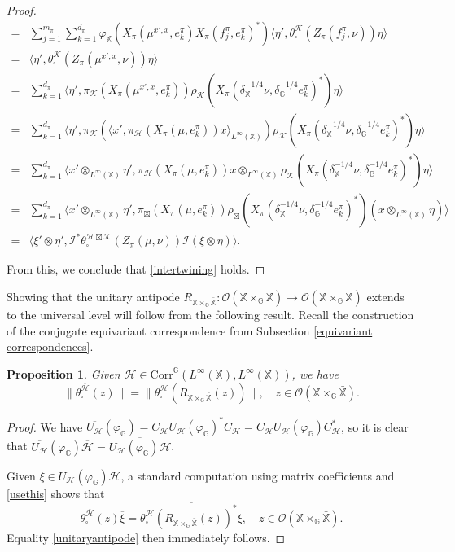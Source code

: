 \documentclass[reqno]{amsart}
\numberwithin{equation}{section}
\newtheorem{Prop}[Theorem]{Proposition}
\newcommand\XGX{\X\times_\G \bar{\X}}
\newcommand{\mcH}{\mathcal{H}}
\newcommand{\mcK}{\mathcal{K}}
\newcommand{\mcO}{\mathcal{O}}
\newcommand{\G}{\mathbb{G}}
\newcommand{\X}{\mathbb{X}}
\newcommand{\Corr}{\mathrm{Corr}}
\begin{document}
\begin{proof}
\begin{align*}
    = &\sum_{j=1}^{m_\pi}\sum_{k=1}^{d_\pi}\varphi_\X(X_\pi(\mu^{x',x}, e_k^\pi)X_\pi(f_j^\pi, e_k^\pi)^*)\langle \eta', \theta_\square^\mcK(Z_\pi(f_j^\pi, \nu))\eta\rangle\\
    = & \langle \eta', \theta_\square^\mcK(Z_\pi(\mu^{x',x}, \nu))\eta\rangle\\
    = & \sum_{k=1}^{d_\pi} \langle \eta', \pi_\mcK(X_\pi(\mu^{x',x}, e_k^\pi))\rho_\mcK(X_\pi(\delta_\X^{-1/4}\nu, \delta_\G^{-1/4}e_k^\pi)^*)\eta\rangle\\
    = & \sum_{k=1}^{d_\pi}\langle \eta', \pi_\mcK(\langle x', \pi_\mcH(X_\pi(\mu, e_k^\pi))x\rangle_{L^\infty(\X)})\rho_\mcK(X_\pi(\delta_\X^{-1/4}\nu, \delta_\G^{-1/4}e_k^\pi)^*)\eta\rangle\\
    =& \sum_{k=1}^{d_\pi} \langle x'\otimes_{L^\infty(\X)} \eta', \pi_\mcH(X_\pi(\mu, e_k^\pi))x\otimes_{L^\infty(\X)} \rho_\mcK(X_\pi(\delta_\X^{-1/4}\nu, \delta_\G^{-1/4}e_k^\pi)^*)\eta\rangle\\
    =&\sum_{k=1}^{d_\pi} \langle x'\otimes_{L^\infty(\X)} \eta', \pi_\boxtimes(X_\pi(\mu, e_k^\pi))\rho_\boxtimes(X_\pi(\delta_\X^{-1/4}\nu, \delta_\G^{-1/4}e_k^\pi)^*)(x\otimes_{L^\infty(\X)} \eta)\rangle\\
    =& \langle \xi'\otimes \eta', \mathcal{I}^*\theta_\square^{\mcH\boxtimes \mcK}(Z_\pi(\mu, \nu)) \mathcal{I}(\xi \otimes \eta)\rangle.
\end{align*}

From this, we conclude that \eqref{intertwining} holds.
 \end{proof}

Showing that the unitary antipode $R_{\XGX}: \mcO(\XGX)\to \mcO(\XGX)$ extends to the universal level will follow from the following result. Recall the construction of the conjugate equivariant correspondence from Subsection \ref{equivariant correspondences}.

\begin{Prop} Given $\mcH \in \Corr^\G(L^\infty(\X), L^\infty(\X))$, we have
\begin{equation}\label{unitaryantipode}
    \|\theta_\square^{\overline{\mcH}}(z)\| = \|\theta_\square^\mcH(R_{\XGX}(z))\|, \quad z\in \mcO(\XGX).
\end{equation}
\end{Prop}
\begin{proof} We have $\overline{U_\mcH}(\varphi_\G)= C_\mcH U_\mcH(\varphi_\G)^*C_\mcH = C_\mcH U_\mcH(\varphi_\G) C_\mcH^*$, so it is clear that $\overline{U_\mcH}(\varphi_\G)\overline{\mcH}= \overline{U_\mcH(\varphi_\G)\mcH}$.

Given $\xi\in U_\mcH(\varphi_\G)\mcH$, a standard computation using matrix coefficients and \eqref{usethis} shows that
$$\theta_\square^{\overline{\mcH}}(z)\overline{\xi}= \overline{\theta^\mcH_\square(R_{\XGX}(z))^*\xi}, \quad z\in \mcO(\XGX).$$
    Equality \eqref{unitaryantipode} then immediately follows.
\end{proof}
\end{document}
